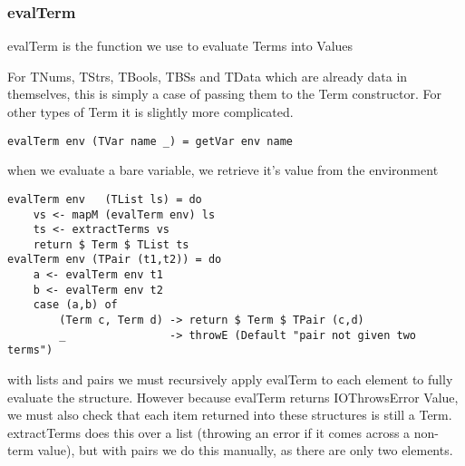 \subsubsection{evalTerm}

evalTerm is the function we use to evaluate Terms into Values

For TNums, TStrs, TBools, TBSs and TData which are already data in themselves, this is simply a case of passing them to the Term constructor. For other types of Term it is slightly more complicated.
\begin{verbatim}
evalTerm env (TVar name _) = getVar env name
\end{verbatim}
when we evaluate a bare variable, we retrieve it's value from the environment

\begin{verbatim}
evalTerm env   (TList ls) = do
    vs <- mapM (evalTerm env) ls
    ts <- extractTerms vs
    return $ Term $ TList ts
evalTerm env (TPair (t1,t2)) = do
    a <- evalTerm env t1
    b <- evalTerm env t2
    case (a,b) of 
        (Term c, Term d) -> return $ Term $ TPair (c,d)
        _                -> throwE (Default "pair not given two terms")
\end{verbatim}
with lists and pairs we must recursively apply evalTerm to each element to fully evaluate the structure. However because evalTerm returns IOThrowsError Value, we must also check that each item returned into these structures is still a Term. extractTerms does this over a list (throwing an error if it comes across a non-term value), but with pairs we do this manually, as there are only two elements. 


